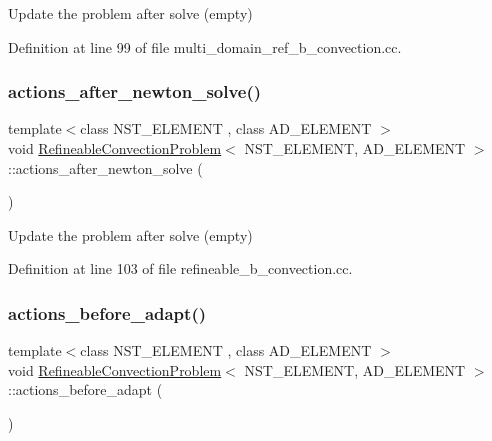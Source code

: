 Update the problem after solve (empty) 



Definition at line 99 of file multi\+\_\+domain\+\_\+ref\+\_\+b\+\_\+convection.\+cc.

\mbox{\label{classRefineableConvectionProblem_a13bda5e5e75928efa88433902ccab7ee}} 
\subsubsection{\texorpdfstring{actions\+\_\+after\+\_\+newton\+\_\+solve()}{actions\_after\_newton\_solve()}\hspace{0.1cm}{\footnotesize\ttfamily [2/2]}}
{\footnotesize\ttfamily template$<$class N\+S\+T\+\_\+\+E\+L\+E\+M\+E\+NT , class A\+D\+\_\+\+E\+L\+E\+M\+E\+NT $>$ \\
void \hyperlink{classRefineableConvectionProblem}{Refineable\+Convection\+Problem}$<$ N\+S\+T\+\_\+\+E\+L\+E\+M\+E\+NT, A\+D\+\_\+\+E\+L\+E\+M\+E\+NT $>$\+::actions\+\_\+after\+\_\+newton\+\_\+solve (\begin{DoxyParamCaption}{ }\end{DoxyParamCaption})\hspace{0.3cm}{\ttfamily [inline]}}



Update the problem after solve (empty) 



Definition at line 103 of file refineable\+\_\+b\+\_\+convection.\+cc.

\mbox{\label{classRefineableConvectionProblem_a962499683ada1233e20055e46b15fdb0}} 
\subsubsection{\texorpdfstring{actions\+\_\+before\+\_\+adapt()}{actions\_before\_adapt()}\hspace{0.1cm}{\footnotesize\ttfamily [1/2]}}
{\footnotesize\ttfamily template$<$class N\+S\+T\+\_\+\+E\+L\+E\+M\+E\+NT , class A\+D\+\_\+\+E\+L\+E\+M\+E\+NT $>$ \\
void \hyperlink{classRefineableConvectionProblem}{Refineable\+Convection\+Problem}$<$ N\+S\+T\+\_\+\+E\+L\+E\+M\+E\+NT, A\+D\+\_\+\+E\+L\+E\+M\+E\+NT $>$\+::actions\+\_\+before\+\_\+adapt (\begin{DoxyParamCaption}{ }\end{DoxyParamCaption})\hspace{0.3cm}{\ttfamily [inline]}}



